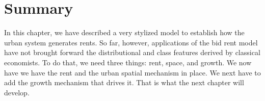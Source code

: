 \section{Summary}



In this chapter, we have described a very stylized model to establish how the urban system generates rents.
So far, however, applications of the bid rent model have not brought forward the distributional and class features derived by classical economists. To do that, we need three things: rent, space, and growth. We now have we have the rent and the urban spatial mechanism in place. We next have to add the growth mechanism that drives it. That is what the next chapter will develop.




